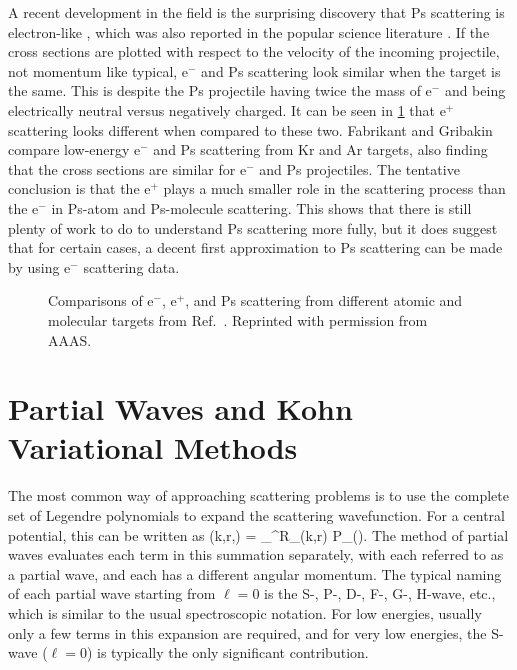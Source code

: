\documentclass[Dissertation.tex]{subfiles}
\begin{document}
A recent development in the field is the surprising discovery that Ps 
scattering is electron-like \cite{Brawley2010,Brawley2010a}, which was also reported in the
popular science literature \cite{NewScientist2015}. If the cross sections are 
plotted with respect to the velocity of the incoming projectile, not momentum 
like typical, e$^-$ and Ps scattering look similar when the target is the same.
This is despite the Ps projectile having twice the mass of e$^-$ and being 
electrically neutral versus negatively charged. It can be seen in
\cref{fig:ScienceBrawley} that e$^+$ scattering looks different when compared
to these two. Fabrikant and Gribakin
\cite{Fabrikant2014,Fabrikant2014a} compare low-energy e$^-$ and Ps scattering
from Kr and Ar targets, also finding that the cross sections are similar for
e$^-$ and Ps projectiles. The tentative conclusion is that the
e$^+$ plays a much smaller role in the scattering process than the e$^-$
in Ps-atom and Ps-molecule scattering. This shows that there is still
plenty of work to do to understand Ps scattering more fully, but it
does suggest that for certain cases, a decent first approximation to Ps
scattering can be made by using e$^-$ scattering data.

\begin{figure}
	\centering
	\caption[Comparisons of e$^-$, e$^+$, and Ps scattering]{Comparisons of
e$^-$, e$^+$, and Ps scattering from different atomic and molecular targets 
from Ref.~\cite{Brawley2010a}. Reprinted with permission from AAAS.}
	\label{fig:ScienceBrawley}
\end{figure}


\section{Partial Waves and Kohn Variational Methods}
\label{sec:KohnIntro}

The most common way of approaching scattering problems is to use the complete
set of Legendre polynomials to expand the scattering wavefunction. For a
central potential, this can be written as \cite{Bransden2003}
\beq
\label{eq:PartialWave}
\Psi(k,r,\theta) = \sum_{}^\infty R_\ell(k,r) P_\ell(\cos\theta).
\eeq
The method of partial waves evaluates each term in this summation separately,
with each referred to as a partial wave, and each has a different angular 
momentum. The typical naming of each partial wave starting from $\ell = 0$
is the S-, P-, D-, F-, G-, H-wave, etc., which is similar to the usual 
spectroscopic notation. For low energies, usually only a few terms in this
expansion are required, and for very low energies, the S-wave ($\ell = 0$) is 
typically the only significant contribution.
\end{document}
